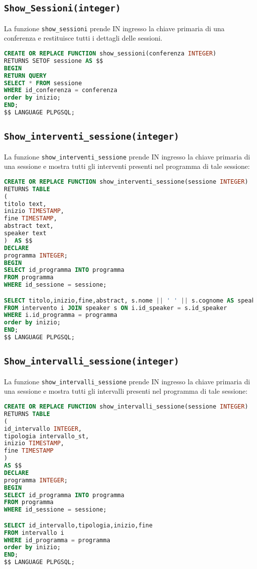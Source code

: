 \subsection{\texttt{Show\_Sessioni(integer)}}
La funzione \texttt{show\_sessioni} prende IN ingresso la chiave primaria di una conferenza e restituisce tutti i dettagli delle sessioni.
\begin{lstlisting}[language=SQL, style=mystyle]
CREATE OR REPLACE FUNCTION show_sessioni(conferenza INTEGER)
RETURNS SETOF sessione AS $$
BEGIN
RETURN QUERY
SELECT * FROM sessione
WHERE id_conferenza = conferenza
order by inizio;
END;
$$ LANGUAGE PLPGSQL;
\end{lstlisting}
\subsection{\texttt{Show\_interventi\_sessione(integer)}}
La funzione \texttt{show\_interventi\_sessione} prende IN ingresso la chiave primaria di una sessione e mostra tutti gli interventi presenti nel programma di tale sessione:
\begin{lstlisting}[language=SQL,style=mystyle]
CREATE OR REPLACE FUNCTION show_interventi_sessione(sessione INTEGER)
RETURNS TABLE
(
titolo text,
inizio TIMESTAMP,
fine TIMESTAMP,
abstract text,
speaker text
)  AS $$
DECLARE 
programma INTEGER;
BEGIN
SELECT id_programma INTO programma
FROM programma
WHERE id_sessione = sessione;

SELECT titolo,inizio,fine,abstract, s.nome || ' ' || s.cognome AS speaker
FROM intervento i JOIN speaker s ON i.id_speaker = s.id_speaker
WHERE i.id_programma = programma
order by inizio;
END;
$$ LANGUAGE PLPGSQL;
\end{lstlisting}

\subsection{\texttt{Show\_intervalli\_sessione(integer)}}
La funzione \texttt{show\_intervalli\_sessione} prende IN ingresso la chiave primaria di una sessione e mostra tutti gli intervalli presenti nel programma di tale sessione:
\begin{lstlisting}[language=SQL,style=mystyle]
CREATE OR REPLACE FUNCTION show_intervalli_sessione(sessione INTEGER)
RETURNS TABLE
(
id_intervallo INTEGER,
tipologia intervallo_st,
inizio TIMESTAMP,
fine TIMESTAMP
)  
AS $$
DECLARE 
programma INTEGER;
BEGIN
SELECT id_programma INTO programma
FROM programma
WHERE id_sessione = sessione;

SELECT id_intervallo,tipologia,inizio,fine
FROM intervallo i
WHERE id_programma = programma
order by inizio;
END;
$$ LANGUAGE PLPGSQL;
\end{lstlisting}
